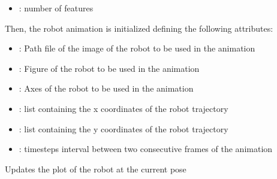 \documentclass[letterpaper,10pt,english]{sphinxmanual}
\begin{document}
\begin{fulllineitems}
\begin{fulllineitems}
\begin{itemize}
\item {} 
\sphinxAtStartPar
{} : number of features

\end{itemize}

\sphinxAtStartPar
Then, the robot animation is initialized defining the following attributes:
\begin{itemize}
\item {} 
\sphinxAtStartPar
{} : Path file of the image of the robot to be used in the animation

\item {} 
\sphinxAtStartPar
{} : Figure of the robot to be used in the animation

\item {} 
\sphinxAtStartPar
{} : Axes of the robot to be used in the animation

\item {} 
\sphinxAtStartPar
{} : list containing the x coordinates of the robot trajectory

\item {} 
\sphinxAtStartPar
{} : list containing the y coordinates of the robot trajectory

\item {} 
\sphinxAtStartPar
{} : time\sphinxhyphen{}steps interval between two consecutive frames of the animation

\end{itemize}

\end{fulllineitems}


\begin{fulllineitems}
\label{\detokenize{robot_simulation:SimulatedRobot.SimulatedRobot.PlotRobot}}
\sphinxAtStartPar
Updates the plot of the robot at the current pose

\end{fulllineitems}



\end{fulllineitems}
\end{document}
